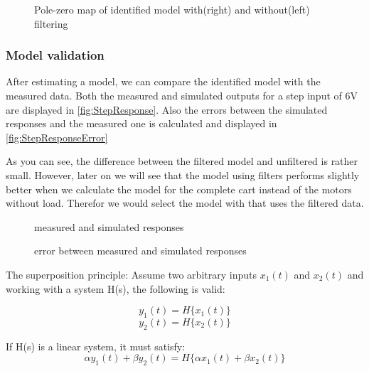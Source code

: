 \documentclass[a4paper]{article}
\newcommand{\newpar}{\vspace{.3cm}\noindent}
\begin{document}
\begin{figure}[H]
    \caption{Pole-zero map of identified model with(right) and without(left) filtering}
    \label{fig:pzmap}
\end{figure}

\subsubsection{Model validation}
After estimating a model, we can compare the identified model with the measured data. Both the measured and simulated outputs for a step input of 6V are displayed in \autoref{fig:StepResponse}. Also the errors between the simulated responses and the measured one is calculated and displayed in \autoref{fig:StepResponseError}

\newpar
As you can see, the difference between the filtered model and unfiltered is rather small. However, later on we will see that the model using filters performs slightly better when we calculate the model for the complete cart instead of the motors without load. Therefor we would select the model with that uses the filtered data.

\begin{figure}[H]
    \caption{measured and simulated responses}
    \label{fig:StepResponse}
\end{figure}

\begin{figure}[H]
    \caption{error between measured and simulated responses}
    \label{fig:StepResponseError}
\end{figure}

\newpar
The superposition principle:
Assume two arbitrary inputs $x_1(t)$ and $x_2(t)$ and working with a system H(s), the following is valid:

\begin{equation}
    y_1(t) = H\{x_1(t)\}
\end{equation}
\begin{equation}
    y_2(t) = H\{x_2(t)\}
\end{equation}

\newpar
If H(s) is a linear system, it must satisfy:
\begin{equation}
    \alpha y_1(t) + \beta y_2(t) = H\{\alpha x_1(t)+\beta x_2(t)\}
\end{equation}
\end{document}
